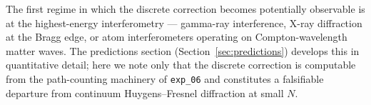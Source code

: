 The first regime in which the discrete correction becomes potentially
observable is at the highest-energy interferometry --- gamma-ray
interference, X-ray diffraction at the Bragg edge, or atom
interferometers operating on Compton-wavelength matter waves. The
predictions section (Section~\ref{sec:predictions}) develops this in
quantitative detail; here we note only that the discrete correction
is computable from the path-counting machinery of \texttt{exp\_06}
and constitutes a falsifiable departure from continuum
Huygens--Fresnel diffraction at small $N$.


